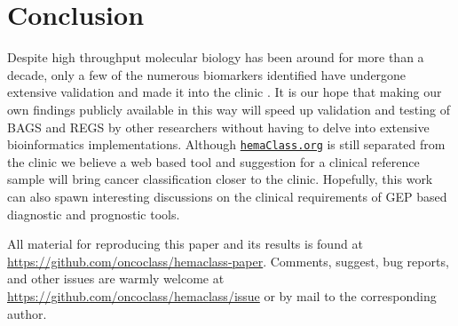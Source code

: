 \documentclass[twocolumn]{bmcart}%
\newcommand{\hemaClass}{\href{http://hemaClass.org}{\texttt{hemaClass.org}}}
\begin{document}
\section{Conclusion}
Despite high throughput molecular biology has been around for more than a decade, only a few of the numerous biomarkers identified have undergone extensive validation and made it into the clinic \cite{Chen2012a}.
It is our hope that making our own findings publicly available in this way will speed up validation and testing of BAGS and REGS by other researchers without having to delve into extensive bioinformatics implementations.
Although \hemaClass{} is still separated from the clinic we believe a web based tool and suggestion for a clinical reference sample will bring cancer classification closer to the clinic.
Hopefully, this work can also spawn interesting discussions on the clinical requirements of GEP based diagnostic and prognostic tools.

All material for reproducing this paper and its results is found at \url{https://github.com/oncoclass/hemaclass-paper}.
Comments, suggest, bug reports, and other issues are warmly welcome at \url{https://github.com/oncoclass/hemaclass/issue} or by mail to the corresponding author.

\end{document}
